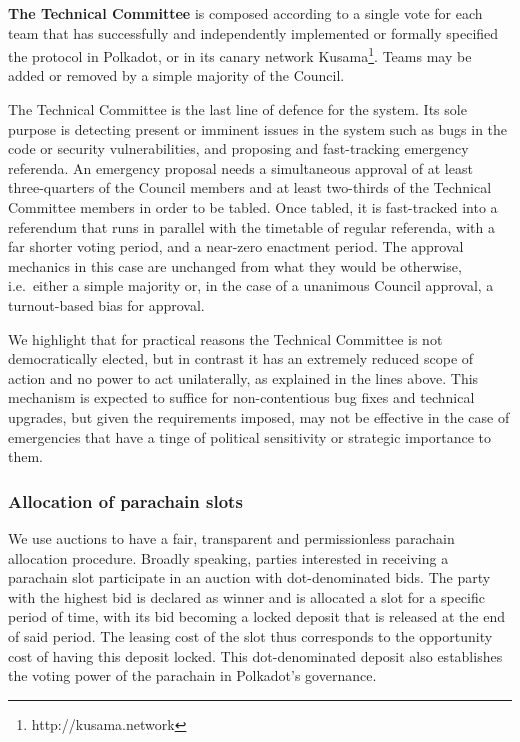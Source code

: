 \medskip

\textbf{The Technical Committee} is composed according to a single vote for each team that has successfully and independently implemented or formally specified the protocol in Polkadot, or in its canary network Kusama\footnote{http://kusama.network}. Teams may be added or removed by a simple majority of the Council. 

The Technical Committee is the last line of defence for the system. Its sole purpose is detecting present or imminent issues in the system such as bugs in the code or security vulnerabilities, and proposing and fast-tracking emergency referenda. An emergency proposal needs a simultaneous approval of at least three-quarters of the Council members and at least two-thirds of the Technical Committee members in order to be tabled. Once tabled, it is fast-tracked into a referendum that runs in parallel with the timetable of regular referenda, with a far shorter voting period, and a near-zero enactment period. The approval mechanics in this case are unchanged from what they would be otherwise, i.e.~either a simple majority or, in the case of a unanimous Council approval, a turnout-based bias for approval.

We highlight that for practical reasons the Technical Committee is not democratically elected, but in contrast it has an extremely reduced scope of action and no power to act unilaterally, as explained in the lines above. This mechanism is expected to suffice for non-contentious bug fixes and technical upgrades, but given the requirements imposed, may not be effective in the case of emergencies that have a tinge of political sensitivity or strategic importance to them. 
 
\subsubsection{Allocation of parachain slots}\label{s:pAllocation}

We use auctions to have a fair, transparent and permissionless parachain allocation procedure. 
Broadly speaking, parties interested in receiving a parachain slot participate in an auction with dot-denominated bids. The party with the highest bid is declared as winner and is allocated a slot for a specific period of time, with its bid becoming a locked deposit that is released at the end of said period. The leasing cost of the slot thus corresponds to the opportunity cost of having this deposit locked. This dot-denominated deposit also establishes the voting power of the parachain in Polkadot's governance.

